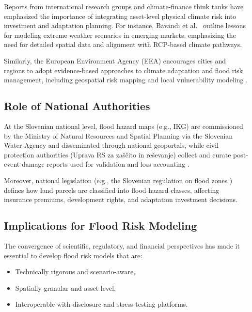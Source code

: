 Reports from international research groups and climate-finance think tanks have emphasized the importance of integrating asset-level physical climate risk into investment and adaptation planning. For instance, Bavandi et al.~\cite{bavandi_physical_2022} outline lessons for modeling extreme weather scenarios in emerging markets, emphasizing the need for detailed spatial data and alignment with RCP-based climate pathways.

Similarly, the European Environment Agency (EEA) encourages cities and regions to adopt evidence-based approaches to climate adaptation and flood risk management, including geospatial risk mapping and local vulnerability modeling \cite{eea2020floods}.

\subsection{Role of National Authorities}

At the Slovenian national level, flood hazard maps (e.g., IKG) are commissioned by the Ministry of Natural Resources and Spatial Planning via the Slovenian Water
Agency and disseminated through national geoportals, while civil protection authorities (Uprava RS za zaščito in reševanje) collect and curate post-event damage reports used for validation and loss accounting \cite{si_ikg_data_2025,urszr_damage_data,noauthor_pravilnik_nodate}.

Moreover, national legislation (e.g., the Slovenian regulation on flood zones \cite{noauthor_pravilnik_nodate}) defines how land parcels are classified into flood hazard classes, affecting insurance premiums, development rights, and adaptation investment decisions.

\subsection{Implications for Flood Risk Modeling}

The convergence of scientific, regulatory, and financial perspectives has made it essential to develop flood risk models that are:

\begin{itemize}
    \item Technically rigorous and scenario-aware,
    \item Spatially granular and asset-level,
    \item Interoperable with disclosure and stress-testing platforms.
\end{itemize}

